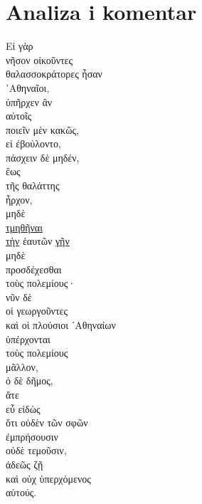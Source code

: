 \section*{Analiza i komentar}
{\large
\begin{greek}
\noindent Eἰ γὰρ\\
νῆσον οἰκοῦντες\\
θαλασσοκράτορες ἦσαν \\
᾿Αθηναῖοι, \\
ὑπῆρχεν ἂν \\
\tabto{2em} αὐτοῖς \\
\tabto{2em} ποιεῖν μὲν κακῶς, \\
\tabto{4em} εἰ ἐβούλοντο, \\
\tabto{2em} πάσχειν δὲ μηδέν, \\
\tabto{4em} ἕως \\
\tabto{6em} τῆς θαλάττης \\
\tabto{4em} ἦρχον, \\
\tabto{4em} μηδὲ \\
\tabto{6em} \underline{τμηθῆναι} \\
\tabto{6em} \underline{τὴν} ἑαυτῶν \underline{γῆν} \\
\tabto{4em} μηδὲ \\
\tabto{6em} προσδέχεσθαι \\
\tabto{6em} τοὺς πολεμίους· \\
νῦν δὲ \\
οἱ γεωργοῦντες \\
\tabto{2em} καὶ οἱ πλούσιοι ᾿Αθηναίων \\
ὑπέρχονται \\
\tabto{2em} τοὺς πολεμίους \\
μᾶλλον, \\
ὁ δὲ δῆμος, \\
\tabto{2em} ἅτε \\
\tabto{2em} εὖ εἰδὼς \\
\tabto{4em} ὅτι οὐδὲν τῶν σφῶν \\
\tabto{4em} ἐμπρήσουσιν \\
\tabto{6em} οὐδὲ τεμοῦσιν, \\
ἀδεῶς ζῇ \\
\tabto{2em} καὶ οὐχ ὑπερχόμενος \\
\tabto{4em} αὐτούς.\\

\end{greek}
}

